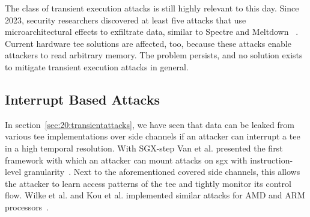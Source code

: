

The class of transient execution attacks is still highly relevant to this day.
Since 2023, security researchers discovered at least five attacks that use
microarchitectural effects to exfiltrate data, similar to Spectre and Meltdown~
\cite{ormandy2023zenbleed,trujillo2023inception, moghimi2023downfall,ragab_ghostrace_2024, wilke2024tdxdown}.
Current hardware \gls{tee} solutions are affected, too, because these attacks
enable attackers to read arbitrary memory. The problem persists, and no solution
exists to mitigate transient execution attacks in general.\\

\subsection{Interrupt Based Attacks}
\label{sec:20:interrupt_sca}
In section~\ref{sec:20:transientattacks}, we have seen that data can be leaked
from various \gls{tee} implementations over side channels if an attacker can
interrupt a \gls{tee} in a high temporal resolution. With SGX-step Van et al.
presented the first framework with which an attacker can mount attacks on
\gls{sgx} with instruction-level granularity~\cite{van2017sgx}. Next to the
aforementioned covered side channels, this allows the attacker to learn access
patterns of the \gls{tee} and tightly monitor its control flow. Wilke et al. and
Kou et al. implemented similar attacks for AMD and ARM
processors~\cite{wilke2023sev, kou2021load}.\\

